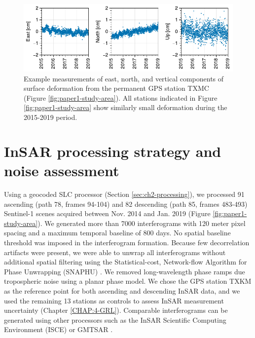 \begin{figure}
	\centering
	\includegraphics[width=0.99\linewidth]{figures/chapter3-permian/gps-txmc.pdf}
	\caption[Example permanent GPS station measurements]{
		Example measurements of east, north, and vertical components of surface deformation from the permanent GPS station TXMC (Figure \ref{fig:paper1-study-area}). All stations indicated in Figure \ref{fig:paper1-study-area} show similarly small deformation during the 2015-2019 period.
	}
	\label{fig:ch3-gps}
\end{figure}


\FloatBarrier

\section{InSAR processing strategy and noise assessment}
\label{sec:ch3-insar-processing}

Using a geocoded SLC processor \citep{Zheng2017PhaseCorrectionSingle, Zebker2017UserFriendlyInsar} (Section \ref{sec:ch2-processing}), we processed 91 ascending (path 78, frames 94-104) and 82 descending (path 85, frames 483-493) Sentinel-1 scenes acquired between Nov. 2014 and Jan. 2019 (Figure \ref{fig:paper1-study-area}). We generated more than 7000 interferograms with 120 meter pixel spacing and a maximum temporal baseline of 800 days. No spatial baseline threshold was imposed in the interferogram formation. Because few decorrelation artifacts were present, we were able to unwrap all interferograms without additional spatial filtering using the Statistical-cost, Network-flow Algorithm for Phase Unwrapping (SNAPHU) \citep{Chen2001TwoDimensionalPhase}. We removed long-wavelength phase ramps due tropospheric noise using a planar phase model.
We chose the GPS station TXKM as the reference point for both ascending and descending InSAR data, and we used the remaining 13 stations as controls to assess InSAR measurement uncertainty (Chapter \ref{CHAP:4-GRL}).
Comparable interferograms can be generated using other processors such as the InSAR Scientific Computing Environment (ISCE) \citep{Rosen2012InsarScientificComputing} or GMTSAR \citep{Sandwell2011OpenRadarInterferometry}. 

